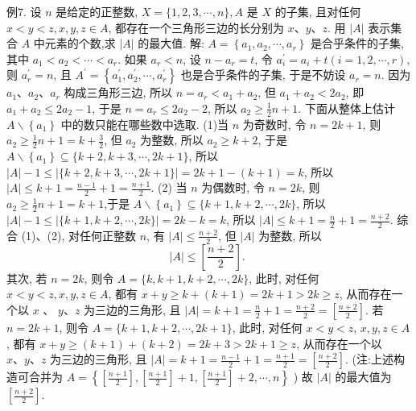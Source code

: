 例7. 设 $n$ 是给定的正整数, $X=\{1,2,3, \cdots, n\}, A$ 是 $X$ 的子集, 且对任何 $x<y<z, x, y, z \in A$, 都存在一个三角形三边的长分别为 $x 、 y 、 z$. 用 $|A|$ 表示集合 $A$ 中元素的个数,求 $|A|$ 的最大值.
解: $A=\left\{a_1, a_2, \cdots, a_r\right\}$ 是合乎条件的子集, 其中 $a_1<a_2<\cdots<a_r$. 如果 $a_r<n$, 设 $n-a_r=t$, 令 $a_i^{\prime}=a_i+t(i=1,2, \cdots, r)$, 则 $a_r^{\prime}=n$, 且 $A^{\prime}= \left\{a_1^{\prime}, a_2^{\prime}, \cdots, a_r^{\prime}\right\}$ 也是合乎条件的子集, 于是不妨设 $a_r=n$.
因为 $a_1 、 a_2 、 a_r$ 构成三角形三边, 所以 $n=a_r<a_1+a_2$, 但 $a_1+a_2<2 a_2$, 即 $a_1+a_2 \leqslant 2 a_2-1$, 于是 $n=a_r \leqslant 2 a_2-2$, 所以 $a_2 \geqslant \frac{1}{2} n+1$.
下面从整体上估计 $A \backslash\left\{a_1\right\}$ 中的数只能在哪些数中选取.
(1)当 $n$ 为奇数时, 令 $n=2 k+1$, 则 $a_2 \geqslant \frac{1}{2} n+1=k+\frac{3}{2}$, 但 $a_2$ 为整数, 所以 $a_2 \geqslant k+2$, 于是 $A \backslash\left\{a_1\right\} \subseteq\{k+2, k+3, \cdots, 2 k+1\}$, 所以 $|A|-1 \leqslant \mid\{k+ 2, k+3, \cdots, 2 k+1\} \mid=2 k+1-(k+1)=k$, 所以 $|A| \leqslant k+1=\frac{n-1}{2}+ 1=\frac{n+1}{2}$.
(2) 当 $n$ 为偶数时, 令 $n=2 k$, 则 $a_2 \geqslant \frac{1}{2} n+1=k+1$,于是 $A \backslash\left\{a_1\right\} \subseteq\{k+ 1, k+2, \cdots, 2 k\}$, 所以 $|A|-1 \leqslant|\{k+1, k+2, \cdots, 2 k\}|=2 k-k=k$, 所以 $|A| \leqslant k+1=\frac{n}{2}+1=\frac{n+2}{2}$.
综合 (1)、(2), 对任何正整数 $n$, 有 $|A| \leqslant \frac{n+2}{2}$, 但 $|A|$ 为整数, 所以
$$
|A| \leqslant\left[\frac{n+2}{2}\right] \text {. }
$$
其次, 若 $n=2 k$, 则令 $A=\{k, k+1, k+2, \cdots, 2 k\}$, 此时, 对任何 $x<y< z, x, y, z \in A$, 都有 $x+y \geqslant k+(k+1)=2 k+1>2 k \geqslant z$, 从而存在一个以 $x$ 、 $y 、 z$ 为三边的三角形, 且 $|A|=k+1=\frac{n}{2}+1=\frac{n+2}{2}=\left[\frac{n+2}{2}\right]$.
若 $n=2 k+1$, 则令 $A=\{k+1, k+2, \cdots, 2 k+1\}$, 此时, 对任何 $x<y<z$, $x, y, z \in A$, 都有 $x+y \geqslant(k+1)+(k+2)=2 k+3>2 k+1 \geqslant z$, 从而存在一个以 $x 、 y 、 z$ 为三边的三角形, 且 $|A|=k+1=\frac{n-1}{2}+1=\frac{n+1}{2}=\left[\frac{n+2}{2}\right]$.
(注:上述构造可合并为 $A=\left\{\left[\frac{n+1}{2}\right],\left[\frac{n+1}{2}\right]+1,\left[\frac{n+1}{2}\right]+2, \cdots, n\right\}$ ) 故 $|A|$ 的最大值为 $\left[\frac{n+2}{2}\right]$.



